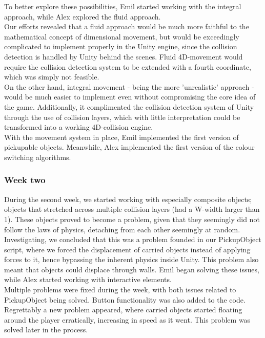 To better explore these possibilities, Emil started working with the integral approach, while Alex explored the fluid approach.\\

Our efforts revealed that a fluid approach would be much more faithful to the mathematical concept of dimensional movement, but would be exceedingly complicated to implement properly in the Unity engine, since the collision detection is handled by Unity behind the scenes. Fluid 4D-movement would require the collision detection system to be extended with a fourth coordinate, which was simply not feasible.\\

On the other hand, integral movement - being the more 'unrealistic' approach - would be much easier to implement even without compromising the core idea of the game. Additionally, it complimented the collision detection system of Unity through the use of collision layers, which with little interpretation could be transformed into a working 4D-collision engine.\\

With the movement system in place, Emil implemented the first version of pickupable objects. Meanwhile, Alex implemented the first version of the colour switching algorithms.

\subsubsection{Week two}
During the second week, we started working with especially composite objects; objects that stretched across multiple collision layers (had a W-width larger than 1). These objects proved to become a problem, given that they seemingly did not follow the laws of physics, detaching from each other seemingly at random.\\

Investigating, we concluded that this was a problem founded in our PickupObject script, where we forced the displacement of carried objects instead of applying forces to it, hence bypassing the inherent physics inside Unity. This problem also meant that objects could displace through walls. Emil began solving these issues, while Alex started working with interactive elements.\\

Multiple problems were fixed during the week, with both issues related to PickupObject being solved. Button functionality was also added to the code. Regrettably a new problem appeared, where carried objects started floating around the player erratically, increasing in speed as it went. This problem was solved later in the process.\\

